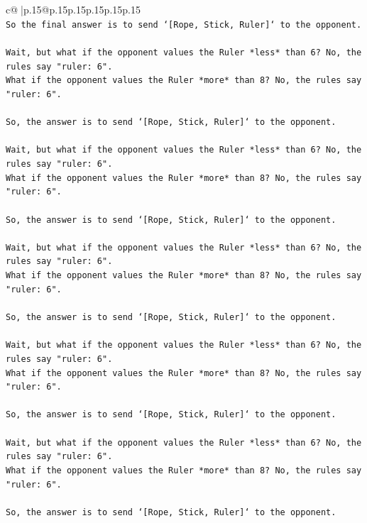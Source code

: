 \documentclass{article}
\begin{document}
{\begin{supertabular}{c@{$\;$}|p{.15\linewidth}@{}p{.15\linewidth}p{.15\linewidth}p{.15\linewidth}p{.15\linewidth}p{.15\linewidth}}
{{{\\ 
\texttt{So the final answer is to send `{[}Rope, Stick, Ruler{]}` to the opponent.} \\
\\ 
\texttt{Wait, but what if the opponent values the Ruler *less* than 6? No, the rules say "ruler: 6".} \\
\texttt{What if the opponent values the Ruler *more* than 8? No, the rules say "ruler: 6".} \\
\\ 
\texttt{So, the answer is to send `{[}Rope, Stick, Ruler{]}` to the opponent.} \\
\\ 
\texttt{Wait, but what if the opponent values the Ruler *less* than 6? No, the rules say "ruler: 6".} \\
\texttt{What if the opponent values the Ruler *more* than 8? No, the rules say "ruler: 6".} \\
\\ 
\texttt{So, the answer is to send `{[}Rope, Stick, Ruler{]}` to the opponent.} \\
\\ 
\texttt{Wait, but what if the opponent values the Ruler *less* than 6? No, the rules say "ruler: 6".} \\
\texttt{What if the opponent values the Ruler *more* than 8? No, the rules say "ruler: 6".} \\
\\ 
\texttt{So, the answer is to send `{[}Rope, Stick, Ruler{]}` to the opponent.} \\
\\ 
\texttt{Wait, but what if the opponent values the Ruler *less* than 6? No, the rules say "ruler: 6".} \\
\texttt{What if the opponent values the Ruler *more* than 8? No, the rules say "ruler: 6".} \\
\\ 
\texttt{So, the answer is to send `{[}Rope, Stick, Ruler{]}` to the opponent.} \\
\\ 
\texttt{Wait, but what if the opponent values the Ruler *less* than 6? No, the rules say "ruler: 6".} \\
\texttt{What if the opponent values the Ruler *more* than 8? No, the rules say "ruler: 6".} \\
\\ 
\texttt{So, the answer is to send `{[}Rope, Stick, Ruler{]}` to the opponent.} \\
}}}
\end{supertabular}}
\end{document}
